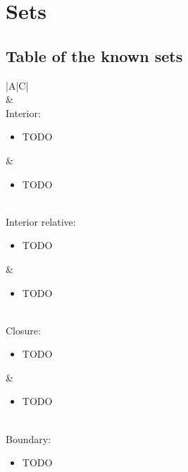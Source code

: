 \documentclass{article}
\begin{document}
\section{Sets}
\subsection{Table of the known sets}
\begin{xltabular}{\textwidth}{|A|C|}
	\hline
	\\
	\hline
	 & \\
	\hline
    Interior:
	\begin{itemize}[leftmargin=*]
		\item TODO \cite[sec. 2.1.6.1]{dattorroConvexOptimizationEuclidean2010} \cite[2.1.3]{boydConvexOptimization2004}
	\end{itemize} & \vspace{-3.5ex}
	\begin{itemize}[leftmargin=*]
		\item TODO
	\end{itemize}\\
	\hline
    Interior relative:
	\begin{itemize}[leftmargin=*]
		\item TODO \cite[sec. 2.1.6.1]{dattorroConvexOptimizationEuclidean2010} \cite[2.1.3]{boydConvexOptimization2004}
	\end{itemize} & \vspace{-3.5ex}
	\begin{itemize}[leftmargin=*]
		\item TODO
	\end{itemize}\\
    \hline
    Closure:
	\begin{itemize}[leftmargin=*]
		\item TODO \cite[appendix A.2]{boydConvexOptimization2004} \cite[sec. 2.1.6.1]{dattorroConvexOptimizationEuclidean2010}
	\end{itemize} & \vspace{-3.5ex}
	\begin{itemize}[leftmargin=*]
		\item TODO
	\end{itemize}\\
    \hline
    Boundary:
    \begin{itemize}[leftmargin=*]
        \item TODO \cite[sec. 2.1.7]{dattorroConvexOptimizationEuclidean2010} \cite[appendix A.2]{boydConvexOptimization2004}

\end{itemize}
\end{xltabular}
\end{document}
